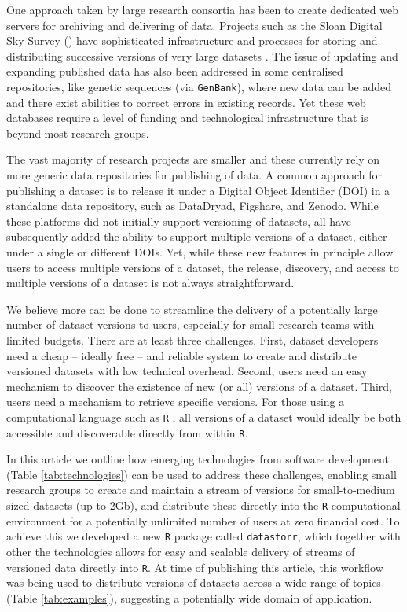 \documentclass[a4paper,num-refs]{assets/oup-contemporary}
\begin{document}
One approach taken by large research consortia has been to create dedicated web servers for archiving and delivering of data. Projects such as the Sloan Digital Sky Survey () have sophisticated infrastructure and processes for storing and distributing successive versions of very large datasets \cite{Abolfathi-2018}. The issue of updating and expanding published data has also been addressed in some centralised repositories, like genetic sequences (via \texttt{GenBank}), where new data can be added and there exist abilities to correct errors in existing records. Yet these web databases require a level of funding and technological infrastructure that is beyond most research groups.

The vast majority of research projects are smaller and these currently rely on more generic data repositories for publishing of data. A common approach for publishing a dataset is to release it under a Digital Object Identifier (DOI) in a standalone data repository, such as DataDryad, Figshare, and Zenodo. While these platforms did not initially support versioning of datasets, all have subsequently added the ability to support multiple versions of a dataset, either under a single or different DOIs. Yet, while these new features in principle allow users to access multiple versions of a dataset, the release, discovery, and access to multiple versions of a dataset is not always straightforward.

We believe more can be done to streamline the delivery of a potentially large number of dataset versions to users, especially for small research teams with limited budgets. There are at least three challenges. First, dataset developers need a cheap -- ideally free -- and reliable system  to create and distribute versioned datasets with low technical overhead. Second, users need an easy mechanism to discover the existence of new (or all) versions of a dataset. Third, users need a mechanism to retrieve specific versions. For those using a computational language such as \texttt{R} \cite{R-2017}, all versions of a dataset would ideally be both accessible and discoverable directly from within \texttt{R}.

In this article we outline how emerging technologies from software development  (Table \ref{tab:technologies}) can be used to address these challenges, enabling small research groups to create and maintain a stream of versions for small-to-medium sized datasets (up to 2Gb), and distribute these directly into the \texttt{R} computational environment for a potentially unlimited number of users at zero financial cost. To achieve this we developed a new \texttt{R} package called \texttt{datastorr}, which together with other the technologies allows for easy and scalable delivery of streams of versioned data directly into \texttt{R}. At time of publishing this article, this workflow was being used to distribute versions of datasets across a wide range of topics (Table \ref{tab:examples}), suggesting a potentially wide domain of application.
\end{document}
